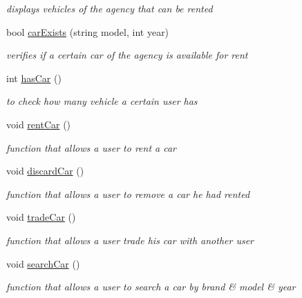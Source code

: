 \begin{Indent}
\begin{DoxyCompactItemize}
\begin{DoxyCompactList}\small\item\em displays vehicles of the agency that can be rented \end{DoxyCompactList}\item 
bool \hyperlink{class_agency_a3332e859279fb7f7ff27916c4b6b6ca3}{car\+Exists} (string model, int year)
\begin{DoxyCompactList}\small\item\em verifies if a certain car of the agency is available for rent \end{DoxyCompactList}\item 
int \hyperlink{class_agency_a7b37fecbc7cf1524b841ac82be7a7d29}{has\+Car} ()
\begin{DoxyCompactList}\small\item\em to check how many vehicle a certain user has \end{DoxyCompactList}\item 
\mbox{\label{class_agency_ab797bb2fa8351c1a5d1946e5be796df7}} 
void \hyperlink{class_agency_ab797bb2fa8351c1a5d1946e5be796df7}{rent\+Car} ()
\begin{DoxyCompactList}\small\item\em function that allows a user to rent a car \end{DoxyCompactList}\item 
\mbox{\label{class_agency_ade564b2cc678fce19a24db37ba3ad956}} 
void \hyperlink{class_agency_ade564b2cc678fce19a24db37ba3ad956}{discard\+Car} ()
\begin{DoxyCompactList}\small\item\em function that allows a user to remove a car he had rented \end{DoxyCompactList}\item 
void \hyperlink{class_agency_a1f58c5179d80187fc0b53a6da93dee90}{trade\+Car} ()
\begin{DoxyCompactList}\small\item\em function that allows a user trade his car with another user \end{DoxyCompactList}\item 
\mbox{\label{class_agency_aae7bafe5a3a5231ace9a73b9835c4c79}} 
void \hyperlink{class_agency_aae7bafe5a3a5231ace9a73b9835c4c79}{search\+Car} ()
\begin{DoxyCompactList}\small\item\em function that allows a user to search a car by brand \& model \& year \end{DoxyCompactList}\item 

\end{DoxyCompactItemize}
\end{Indent}
